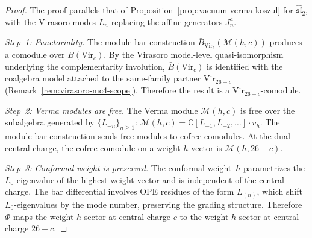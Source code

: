 \begin{proof}
The proof parallels that of
Proposition~\ref{prop:vacuum-verma-koszul} for $\widehat{\mathfrak{sl}}_2$,
with the Virasoro modes $L_n$ replacing the affine generators $J^a_n$.

\emph{Step~1: Functoriality.}
The module bar construction $\bar{B}_{\mathrm{Vir}_c}(\mathcal{M}(h,c))$
produces a comodule over $\bar{B}(\mathrm{Vir}_c)$. By the
Virasoro model-level quasi-isomorphism underlying the complementarity
involution, $\bar{B}(\mathrm{Vir}_c)$ is identified with the coalgebra
 model attached to the same-family partner $\mathrm{Vir}_{26-c}$
 (Remark~\ref{rem:virasoro-mc4-scope}).
 Therefore the result is a
 $\mathrm{Vir}_{26-c}$-comodule.

\emph{Step~2: Verma modules are free.}
The Verma module $\mathcal{M}(h,c)$ is free over the subalgebra
generated by $\{L_{-n}\}_{n \geq 1}$:
$\mathcal{M}(h,c) = \mathbb{C}[L_{-1}, L_{-2}, \ldots] \cdot v_h$.
The module bar construction sends free modules to cofree comodules.
At the dual central charge, the cofree comodule on a
weight-$h$ vector is $\mathcal{M}(h, 26-c)$.

\emph{Step~3: Conformal weight is preserved.}
The conformal weight~$h$ parametrizes the $L_0$-eigenvalue of the
highest weight vector and is independent of the central charge.
The bar differential involves OPE residues of the form
$L_{(n)}$, which shift $L_0$-eigenvalues by the mode number,
preserving the grading structure. Therefore $\Phi$ maps the
weight-$h$ sector at central charge $c$ to the weight-$h$ sector
at central charge $26-c$.
\end{proof}

